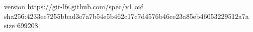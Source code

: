version https://git-lfs.github.com/spec/v1
oid sha256:4233ee7255bbad3e7a7b54e5b462c17c7d4576b46ce23a85eb46053229512a7a
size 699208
